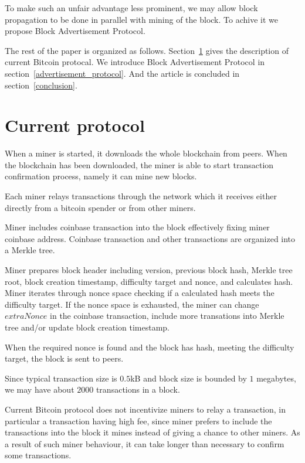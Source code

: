 \documentclass[12pt]{elsarticle}
\begin{document}
To make such an unfair advantage less prominent, we may allow block propagation to be done in parallel with mining of the block. To achive it we propose Block Advertisement Protocol.

The rest of the paper is organized as follows. Section~\ref{current_protocol} gives the description of current Bitcoin protocal. We introduce Block Advertisement Protocol in section~\ref{advertisement_protocol}. And the article is concluded in section~\ref{conclusion}.

\section{Current protocol}
\label{current_protocol}

When a miner is started, it downloads the whole blockchain from peers. When the blockchain has been downloaded, the miner is able to start transaction confirmation process, namely it can mine new blocks.

Each miner relays transactions through the network which it receives either directly from a bitcoin spender or from other miners.

Miner includes coinbase transaction into the block effectively fixing miner coinbase address. Coinbase transaction and other transactions are organized into a Merkle tree.

Miner prepares block header including version, previous block hash, Merkle tree root, block creation timestamp, difficulty target and nonce, and calculates hash. Miner iterates through nonce space checking if a calculated hash meets the difficulty target. If the nonce space is exhausted, the miner can change $extraNonce$ in the coinbase transaction, include more transations into Merkle tree and/or update block creation timestamp.

When the required nonce is found and the block has hash, meeting the difficulty target, the block is sent to peers.

Since typical transaction size is $0.5$kB and block size is bounded by $1$ megabytes, we may have about $2000$ transactions in a block.

Current Bitcoin protocol does not incentivize miners to relay a transaction, in particular a transaction having high fee, since miner prefers to include the transactions into the block it mines instead of giving a chance to other miners. As a result of such miner behaviour, it can take longer than necessary to confirm some transactions.
\end{document}
